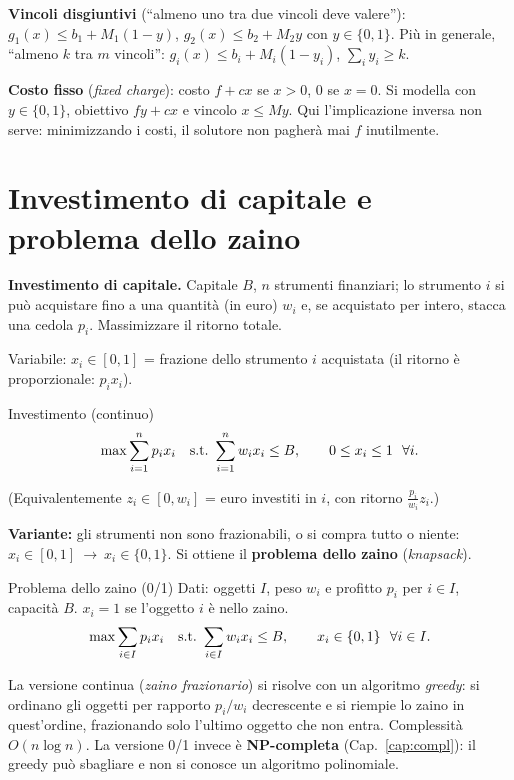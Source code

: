 \textbf{Vincoli disgiuntivi} (``almeno uno tra due vincoli deve valere''): $g_1(x)\le b_1+M_1(1-y)$, $g_2(x)\le b_2+M_2y$ con $y\in\{0,1\}$. Più in generale, ``almeno $k$ tra $m$ vincoli'': $g_i(x)\le b_i+M_i(1-y_i)$, $\sum_i y_i\ge k$.

\textbf{Costo fisso} (\emph{fixed charge}): costo $f+cx$ se $x>0$, $0$ se $x=0$. Si modella con $y\in\{0,1\}$, obiettivo $fy+cx$ e vincolo $x\le My$. Qui l'implicazione inversa non serve: minimizzando i costi, il solutore non pagherà mai $f$ inutilmente.

\section{Investimento di capitale e problema dello zaino}\label{sec:zaino}

\textbf{Investimento di capitale.} Capitale $B$, $n$ strumenti finanziari; lo strumento $i$ si può acquistare fino a una quantità (in euro) $w_i$ e, se acquistato per intero, stacca una cedola $p_i$. Massimizzare il ritorno totale.

Variabile: $x_i\in[0,1]$ = frazione dello strumento $i$ acquistata (il ritorno è proporzionale: $p_ix_i$).
\begin{modello}{Investimento (continuo)}
\[ \max\sum_{i=1}^n p_ix_i\quad\text{s.t.}\ \sum_{i=1}^n w_ix_i\le B,\qquad 0\le x_i\le 1\ \ \forall i. \]
\end{modello}
(Equivalentemente $z_i\in[0,w_i]$ = euro investiti in $i$, con ritorno $\frac{p_i}{w_i}z_i$.)

\textbf{Variante:} gli strumenti non sono frazionabili, o si compra tutto o niente: $x_i\in[0,1]\ \to\ x_i\in\{0,1\}$. Si ottiene il \textbf{problema dello zaino} (\emph{knapsack}).

\begin{modello}{Problema dello zaino (0/1)}
Dati: oggetti $I$, peso $w_i$ e profitto $p_i$ per $i\in I$, capacità $B$. $x_i=1$ se l'oggetto $i$ è nello zaino.
\[ \max\sum_{i\in I}p_ix_i\quad\st\ \sum_{i\in I}w_ix_i\le B,\qquad x_i\in\{0,1\}\ \ \forall i\in I. \]
\end{modello}

\begin{oss}
La versione continua (\emph{zaino frazionario}) si risolve con un algoritmo \emph{greedy}: si ordinano gli oggetti per rapporto $p_i/w_i$ decrescente e si riempie lo zaino in quest'ordine, frazionando solo l'ultimo oggetto che non entra. Complessità $O(n\log n)$. La versione 0/1 invece è \textbf{NP-completa} (Cap.~\ref{cap:compl}): il greedy può sbagliare e non si conosce un algoritmo polinomiale.
\end{oss}

